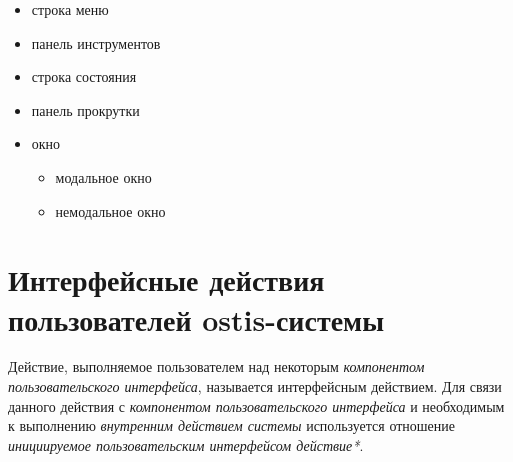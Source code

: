 \begin{itemize}
\begin{itemize}
\begin{itemize}
			\item строка меню
			\item панель инструментов
			\item строка состояния
			\item панель прокрутки
			\item окно
			\begin{itemize}
				\item модальное окно
				\item немодальное окно
			\end{itemize}
		\end{itemize}
	\end{itemize}
\end{itemize}


\section{Интерфейсные действия пользователей ostis-системы}


Действие, выполняемое пользователем над некоторым \textit{компонентом пользовательского интерфейса}, называется интерфейсным действием. Для связи данного действия с \textit{компонентом пользовательского интерфейса} и необходимым к выполнению \textit{внутренним действием системы} используется отношение \textit{инициируемое пользовательским интерфейсом действие*}.

